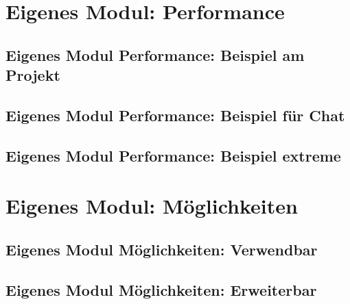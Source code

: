 \section{Eigenes Modul: Performance}

\subsection{Eigenes Modul Performance: Beispiel am Projekt}
\subsection{Eigenes Modul Performance: Beispiel für Chat}
\subsection{Eigenes Modul Performance: Beispiel extreme}



\section{Eigenes Modul: Möglichkeiten}

\subsection{Eigenes Modul Möglichkeiten: Verwendbar}
\subsection{Eigenes Modul Möglichkeiten: Erweiterbar}